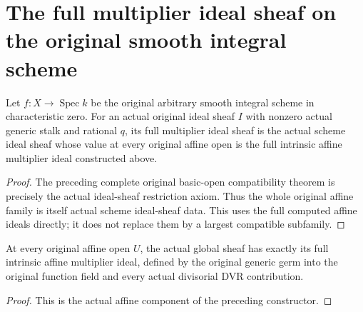 \section{The full multiplier ideal sheaf on the original smooth integral scheme}

\begin{definition}\label{def:sc0-original-global-multiplier-ideal-sheaf}
\leanok
{}
Let $f:X\to\operatorname{Spec} k$ be the original arbitrary smooth
integral scheme in characteristic zero. For an actual original
ideal sheaf $I$ with nonzero actual generic stalk and rational $q$,
its full multiplier ideal sheaf is the actual scheme ideal sheaf
whose value at every original affine open is the full intrinsic
affine multiplier ideal constructed above.
\end{definition}
\begin{proof}
The preceding complete original basic-open compatibility theorem
is precisely the actual ideal-sheaf restriction axiom. Thus the
whole original affine family is itself actual scheme ideal-sheaf
data. This uses the full computed affine ideals directly; it does
not replace them by a largest compatible subfamily.
\end{proof}

\begin{theorem}\label{thm:sc0-original-global-multiplier-ideal-affine-values}
\leanok
{}
At every original affine open $U$, the actual global sheaf has
exactly its full intrinsic affine multiplier ideal, defined by the
original generic germ into the original function field and every
actual divisorial DVR contribution.
\end{theorem}
\begin{proof}
This is the actual affine component of the preceding constructor.
\end{proof}

